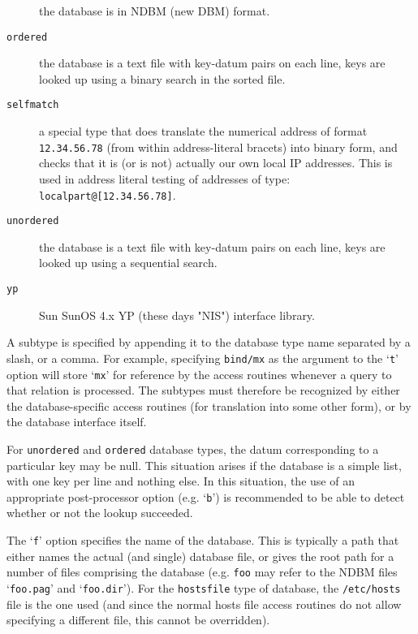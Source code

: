 \begin{description}
the database is in NDBM (new DBM) format.

\item[{\tt ordered}] \mbox{}

the database is a text file with key-datum pairs on each line, keys are looked up using a binary search in the sorted file.

\item[{\tt selfmatch}] \mbox{}

a special type that does translate the numerical address of format
\verb/12.34.56.78/ (from within address-literal bracets) into binary
form, and checks that it is (or is not) actually our own local IP addresses.
This is used in address literal testing of addresses of type:
\verb/localpart@[12.34.56.78]/.

\item[{\tt unordered}] \mbox{}

the database is a text file with key-datum pairs on each line, keys are looked up using a sequential search.

\item[{\tt yp}] \mbox{}

Sun SunOS 4.x YP (these days "NIS") interface library.

\end{description}


A subtype is specified by appending it to the database type name separated
by a slash, or a comma.
For example, specifying {\tt bind/mx} as the argument to the `{\tt t}' option
will store `{\tt mx}' for reference by the access routines whenever a query
to that relation is processed.
The subtypes must therefore be recognized by either the database-specific
access routines (for translation into some other form), or by the database
interface itself.

For {\tt unordered} and {\tt ordered} database types, the datum 
corresponding to a particular key may be null.  This situation arises if 
the database is a simple list, with one key per line and nothing else.  
In this situation, the use of an appropriate post-processor option 
(e.g. `{\tt b}') is recommended to be able to detect whether or not 
the lookup succeeded.

The `{\tt f}' option specifies the name of the database.  This is typically a
path that either names the actual (and single) database file, or gives the
root path for a number of files comprising the database (e.g. {\tt foo} may
refer to the NDBM files `{\tt foo.pag}' and `{\tt foo.dir}').  For the 
{\tt hostsfile} type of database, the {\tt /etc/hosts} file is the one 
used (and since the normal hosts file access routines do not allow specifying 
a different file, this cannot be overridden).

